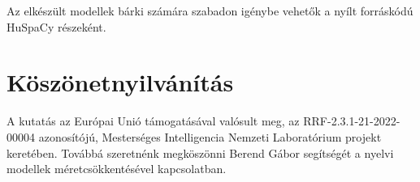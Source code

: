 \documentclass{llncs}
\newcommand{\huspacy}{HuSpaCy}
\begin{document}
Az elkészült modellek bárki számára szabadon igénybe vehetők a nyílt forráskódú \huspacy{} részeként.

\section*{Köszönetnyilvánítás}

A kutatás az Európai Unió támogatásával valósult meg, az
RRF-2.3.1-21-2022-00004 azonosítójú, Mesterséges Intelligencia Nemzeti Laboratórium projekt keretében. Továbbá szeretnénk megköszönni Berend Gábor segítségét a nyelvi modellek méretcsökkentésével kapcsolatban.

\renewcommand\bibname{Hivatkoz\'asok}



\end{document}
